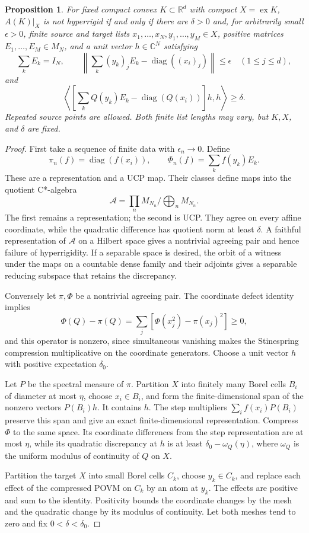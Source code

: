 \documentclass[11pt,letterpaper]{amsart}
\newtheorem{proposition}[theorem]{Proposition}
\theoremstyle{definition}
\theoremstyle{remark}
\numberwithin{equation}{section}
\DeclareMathOperator{\ex}{ex}
\DeclareMathOperator{\diag}{diag}
\newcommand{\R}{\mathbb R}
\newcommand{\C}{\mathbb C}
\begin{document}
\begin{proposition}\label{new:finite}
For fixed compact convex $K\subset\R^d$ with compact $X=\ex K$,
$A(K)|_X$ is not hyperrigid if and only if there are $\delta>0$ and,
for arbitrarily small $\epsilon>0$, finite source and target lists
$x_1,\ldots,x_N,y_1,\ldots,y_M\in X$, positive matrices
$E_1,\ldots,E_M\in M_N$, and a unit vector $h\in\C^N$ satisfying
\[
 \sum_kE_k=I_N,\qquad
 \left\|\sum_k(y_k)_jE_k-\diag((x_i)_j)\right\|\le\epsilon
                           \quad(1\le j\le d),
\]
and
\[
 \left\langle\left[\sum_kQ(y_k)E_k-\diag(Q(x_i))\right]h,h\right\rangle
 \ge\delta.
\]
Repeated source points are allowed. Both finite list lengths may vary,
but $K,X$, and $\delta$ are fixed.
\end{proposition}
\begin{proof}
First take a sequence of finite data with $\epsilon_n\to0$. Define
\[
 \pi_n(f)=\diag(f(x_i)),\qquad \Phi_n(f)=\sum_kf(y_k)E_k.
\]
These are a representation and a UCP map. Their classes define maps
into the quotient C*-algebra
\[
             \mathcal A=\prod_nM_{N_n}\big/\bigoplus_nM_{N_n}.
\]
The first remains a representation; the second is UCP. They agree on
every affine coordinate, while the quadratic difference has quotient
norm at least $\delta$. A faithful representation of $\mathcal A$ on
a Hilbert space gives a nontrivial agreeing pair and hence failure of
hyperrigidity. If a separable space is desired, the orbit of a witness
under the maps on a countable dense family and their adjoints gives a
separable reducing subspace that retains the discrepancy.

Conversely let $\pi,\Phi$ be a nontrivial agreeing pair. The coordinate
defect identity implies
\[
             \Phi(Q)-\pi(Q)=\sum_j
             [\Phi(x_j^2)-\pi(x_j)^2]\ge0,
\]
and this operator is nonzero, since simultaneous vanishing makes the
Stinespring compression multiplicative on the coordinate generators.
Choose a unit vector $h$ with positive expectation $\delta_0$.

Let $P$ be the spectral measure of $\pi$. Partition $X$ into finitely
many Borel cells $B_i$ of diameter at most $\eta$, choose $x_i\in B_i$,
and form the finite-dimensional span of the nonzero vectors $P(B_i)h$.
It contains $h$. The step multipliers $\sum_i f(x_i)P(B_i)$ preserve
this span and give an exact finite-dimensional representation. Compress
$\Phi$ to the same space. Its coordinate differences from the step
representation are at most $\eta$, while its quadratic discrepancy at
$h$ is at least $\delta_0-\omega_Q(\eta)$, where $\omega_Q$ is the
uniform modulus of continuity of $Q$ on $X$.

Partition the target $X$ into small Borel cells $C_k$, choose
$y_k\in C_k$, and replace each effect of the compressed POVM on $C_k$
by an atom at $y_k$. The effects are positive and sum to the identity.
Positivity bounds the coordinate changes by the mesh and the quadratic
change by its modulus of continuity. Let both meshes tend to zero and
fix $0<\delta<\delta_0$.
\end{proof}
\end{document}
